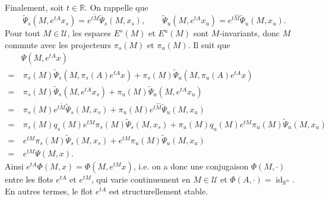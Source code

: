 \documentclass[french]{article}
\theoremstyle{definition}
\newcommand{\wh}[1]{\widehat{#1}}
\newcommand{\wt}[1]{\widetilde{#1}}
\newcommand{\Rbb}{\mathbb{R}}
\newcommand{\Ucal}{\mathcal{U}}
\newcommand{\id}{\operatorname{id}}
\begin{document}
\begin{enumerate}
    Finalement, soit $t \in \Rbb$. On rappelle que
        $$\wt{\Psi}_s(M,e^{tA}x_s) = e^{t\wt{M}}\wt{\Psi}_s(M,x_s), \qquad \wt{\Psi}_u(M,e^{tA}x_u) = e^{t\wh{M}}\wt{\Psi}_u(M,x_u).$$
    Pour tout $M \in \Ucal$, les espaces $E^s(M)$ et $E^u(M)$ sont $M$-invariants, donc $M$ commute avec les projecteurs $\pi_s(M)$ et $\pi_u(M)$. Il suit que
        \begin{align*}
            & \Psi(M,e^{tA}x) \\
            = & \  \pi_s(M)\wt{\Psi}_s(M, \pi_s(A)e^{tA}x) + \pi_s(M)\wt{\Psi}_u(M, \pi_u(A)e^{tA}x) \\
            = & \  \pi_s(M)\wt{\Psi}_s(M, e^{tA}x_s) + \pi_u(M)\wt{\Psi}_u(M, e^{tA}x_u)\\
            = & \ \pi_s(M)e^{t\wt{M}}\wt{\Psi}_s(M,x_s) + \pi_u(M)e^{t\wh{M}}\wt{\Psi}_u(M,x_u)\\
            = & \ \pi_s(M)q_s(M)e^{tM}\pi_s(M)\wt{\Psi}_s(M,x_s) + \pi_u(M)q_u(M)e^{tM}\pi_u(M)\wt{\Psi}_u(M,x_u)\\
            = & \ e^{tM}\pi_s(M)\wt{\Psi}_s(M,x_s) + e^{tM}\pi_u(M)\wt{\Psi}_u(M,x_u)\\
            = & \ e^{tM}\Psi(M,x).
        \end{align*}
    Ainsi $e^{tA}\Phi(M,x) = \Phi(M,e^{tM}x)$, i.e. on a donc une conjugaison $\Phi(M,\cdot)$ entre les flots $e^{tA}$ et $e^{tM}$, qui varie continuement en $M \in \Ucal$ et $\Phi(A, \cdot) = \id_{\Rbb^n}$. En autres termes, le flot $e^{tA}$ est structurellement stable.
\end{enumerate}
\end{document}
